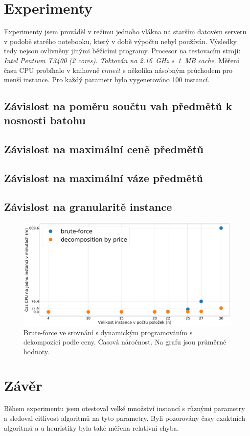 \documentclass[11pt]{article}
\begin{document}
\section{Experimenty}
 
Experimenty jsem prováděl v režimu jednoho vlákna na starším datovém serveru v podobě starého notebooku, který v době výpočtu nebyl používán. Výsledky tedy nejsou ovlivněny jinými běžícími programy. Procesor na testovacím stroji: \textit{Intel Pentium T3400 (2 cores). Taktován na 2.16~GHz s~1~MB cache}.
Měření času CPU probíhalo v knihovně $timeit$ s několika násobným průchodem pro menší instance. Pro každý parametr bylo vygenerováno 100 instancí.




\subsection{Závislost na poměru součtu vah předmětů k nosnosti batohu}
\subsection{Závislost na maximální ceně předmětů}
\subsection{Závislost na maximální váze předmětů}
\subsection{Závislost na granularitě instance}



\begin{figure}[h]\centering
	\includegraphics[scale=0.2]{img/tBavg}
 	\caption[1]{Brute-force ve srovnání s dynamickým programováním s dekompozicí podle ceny. Časová náročnost. Na grafu jsou průměrné hodnoty.}\label{fig:1}
 \end{figure} 	


\section{Závěr}
Během experimentu jsem otestoval velké množství instancí s různými parametry a sledoval citlivost algoritmů na tyto parametry. Byli pozorovány časy exaktních algoritmů a u heuristiky byla také měřena relativní chyba. 
\end{document}
